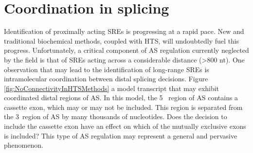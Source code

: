 
\section{Coordination in splicing}



Identification of proximally acting SREs is progressing at a rapid pace. New and traditional biochemical methods, coupled with HTS, will undoubtedly fuel this progress. Unfortunately, a critical component of AS regulation currently neglected by the field is that of SREs acting across a considerable distance (>800 nt). One observation that may lead to the identification of long-range SREs is intramolecular coordination between distal splicing decisions. Figure \ref{fig:NoConnectivityInHTSMethods} a model transcript that may exhibit coordinated distal regions of AS. In this model, the 5\textprime~ region of AS contains a cassette exon, which may or may not be included. This region is separated from the 3\textprime~region of AS by many thousands of nucleotides. Does the decision to include the cassette exon have an effect on which of the mutually exclusive exons is included? This type of AS regulation may represent a general and pervasive phenomenon.

